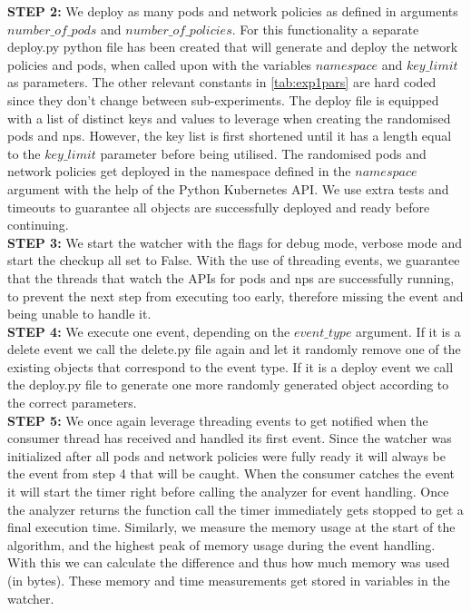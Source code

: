 \textbf{STEP 2:} We deploy as many pods and network policies as defined in arguments \newline $number\_of\_pods$ and $number\_of\_policies$. For this functionality a separate deploy.py python file has been created that will generate and deploy the network policies and pods, when called upon with the variables $namespace$ and $key\_limit$ as parameters. The other relevant constants in \autoref{tab:exp1pars} are hard coded since they don't change between sub-experiments. The deploy file is equipped with a list of distinct keys and values to leverage when creating the randomised pods and \acrshort{np}s. However, the key list is first shortened until it has a length equal to the $key\_limit$ parameter before being utilised. The randomised pods and network policies get deployed in the namespace defined in the $namespace$ argument with the help of the Python Kubernetes API. We use extra tests and timeouts to guarantee all objects are successfully deployed and ready before continuing.
\\[10pt]

\textbf{STEP 3:} We start the watcher with the flags for debug mode, verbose mode and start the checkup all set to False. With the use of threading events, we guarantee that the threads that watch the APIs for pods and \acrshort{np}s are successfully running, to prevent the next step from executing too early, therefore missing the event and being unable to handle it.
\\[10pt]

\textbf{STEP 4:} We execute one event, depending on the $event\_type$ argument. If it is a delete event we call the delete.py file again and let it randomly remove one of the existing objects that correspond to the event type. If it is a deploy event we call the deploy.py file to generate one more randomly generated object according to the correct parameters.
\\[10pt]

\textbf{STEP 5:} We once again leverage threading events to get notified when the consumer thread has received and handled its first event. Since the watcher was initialized after all pods and network policies were fully ready it will always be the event from step 4 that will be caught. When the consumer catches the event it will start the timer right before calling the analyzer for event handling. Once the analyzer returns the function call the timer immediately gets stopped to get a final execution time. Similarly, we measure the memory usage at the start of the algorithm, and the highest peak of memory usage during the event handling. With this we can calculate the difference and thus how much memory was used (in bytes). These memory and time measurements get stored in variables in the watcher.
\\[10pt]


